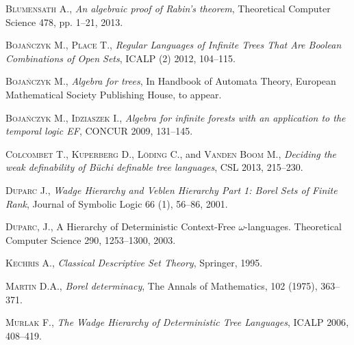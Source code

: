 \begin{thebibliography}{00}

\textsc{Blumensath} A., \emph{An algebraic proof of Rabin's theorem}, Theoretical Computer Science \textsc{478}, pp. 1--21, 2013.

\textsc{Boja\'nczyk} M., \textsc{Place} T., \emph{Regular Languages of Infinite Trees That Are Boolean Combinations of Open Sets}, ICALP (2) \textsc{2012}, 104--115.

\textsc{Boja\'nczyk} M., \emph{Algebra for trees}, In Handbook of Automata Theory, European
Mathematical Society Publishing House, to appear.

\textsc{Boja\'nczyk} M., \textsc{Idziaszek} I., \emph{Algebra for infinite forests with an
application to the temporal logic EF}, CONCUR \textsc{2009}, 131--145.


\textsc{Colcombet} T., \textsc{Kuperberg} D., \textsc{Löding} C., and \textsc{Vanden Boom} M., \emph{Deciding the weak definability of Büchi definable tree languages}, CSL \textsc{2013}, 215--230.


\textsc{Duparc} J., \emph{Wadge Hierarchy and Veblen Hierarchy Part 1: Borel Sets of Finite Rank}, Journal of Symbolic Logic \textsc{66} (1), 56--86, 2001.


\textsc{Duparc}, J., A Hierarchy of Deterministic Context-Free $\omega$-languages.
Theoretical Computer Science \textsc{290}, 1253--1300, 2003.



\textsc{Kechris} A., \emph{Classical Descriptive Set Theory}, Springer, \textsc{1995}.


\textsc{Martin} D.A., \emph{Borel determinacy}, The Annals of Mathematics, \textsc{102} (1975), 363--371.

\textsc{Murlak} F., \emph{The Wadge Hierarchy of Deterministic Tree Languages}, ICALP \textsc{2006}, 408--419. 


\end{thebibliography}
